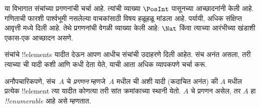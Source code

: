 \documentclass[../../../include/open-logic-section]{subfiles}
\begin{document}


\begin{editorial}
  या विभागात संचांच्या प्रगणनांची चर्चा आहे. त्यांची व्याख्या
  $\PosInt$ पासूनच्या आच्छादनांनी केली आहे. गणिताची फारशी पार्श्वभूमी
  नसलेल्या वाचकांसाठी विषय हळूहळू मांडला आहे. पर्यायी, अधिक संक्षिप्त
  आवृत्ती  मध्ये दिली आहे. तेथे प्रगणनांची वेगळी
  व्याख्या केली आहे: $\Nat$ किंवा त्याच्या आरंभीच्या खंडाशी
  एकास-एक आच्छादन असणे.
\end{editorial}

\begin{explain}
संचांचे !!{element}s यादीत देऊन आपण आधीच संचांची उदाहरणे दिली आहेत.
संच अनंत असला, तरी त्याच्या ची यादी कशी आणि कधी
देता येते, याची आता अधिक व्यापकपणे चर्चा करू.
\end{explain}

\begin{defn}[प्रगणनाची अनौपचारिक व्याख्या]
अनौपचारिकपणे, संच~$A$ चे \emph{प्रगणन} म्हणजे~$A$ मधील
ची अशी यादी (कदाचित अनंत) की $A$ मधील प्रत्येक
!!{element} त्या यादीत कोणत्या तरी सांत क्रमांकाच्या स्थानी येतो.
$A$ चे प्रगणन असेल, तर $A$ हा \emph{!!{enumerable}} आहे असे म्हणतात.
\end{defn}
\end{document}
